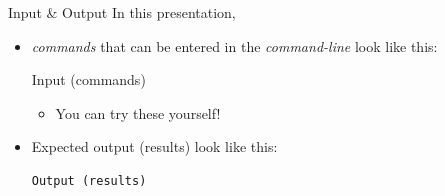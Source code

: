 \documentclass[
  11pt,
  ignorenonframetext,
]{beamer}
\newenvironment{Shaded}{\begin{snugshade}}{\end{snugshade}}
\newcommand{\NormalTok}[1]{#1}
\providecommand{\tightlist}{%
  \setlength{\itemsep}{0pt}\setlength{\parskip}{0pt}}
\begin{document}
\begin{frame}[fragile]{Input \& Output}
\protect\hypertarget{input-output}{}
In this presentation,

\begin{itemize}
\item
  \emph{commands} that can be entered in the \emph{command-line} look
  like this:

\hypertarget{format_input}{%
\label{format_input}}%
\begin{Shaded}
\begin{Highlighting}[]
\NormalTok{Input (commands)}
\end{Highlighting}
\end{Shaded}

  \begin{itemize}
  \tightlist
  \item
    You can try these yourself!
  \end{itemize}
\item
  Expected output (results) look like this:

\begin{verbatim}
Output (results)
\end{verbatim}
\end{itemize}
\end{frame}
\end{document}
